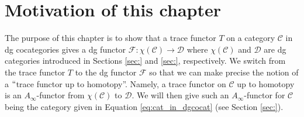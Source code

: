 \section{Motivation of this chapter}
The purpose of this chapter is to 
show that a trace functor $T$ on a 
category $\mathcal{C}$ in dg cocategories 
gives a dg functor $\mathcal{F}: 
\chi(\mathcal{C}) \to \mathcal{D}$ where 
$\chi(\mathcal{C})$ and 
$\mathcal{D}$ are dg categories 
introduced in Sections \ref{sec:} and 
\ref{sec:}, respectively. We switch from 
the trace functor $T$ to the dg functor 
$\mathcal{F}$ so that we can make 
precise the notion of a $``$trace 
functor up to homotopy''. Namely, a 
trace functor on $\mathcal{C}$ up to homotopy 
is an $A_\infty$-functor from 
$\chi(\mathcal{C})$ to $\mathcal{D}$. 
We will then give such an $A_\infty$-functor 
for $\mathcal{C}$ being the category 
given in Equation \ref{eq:cat_in_dgcocat} 
(see Section \ref{sec:}).